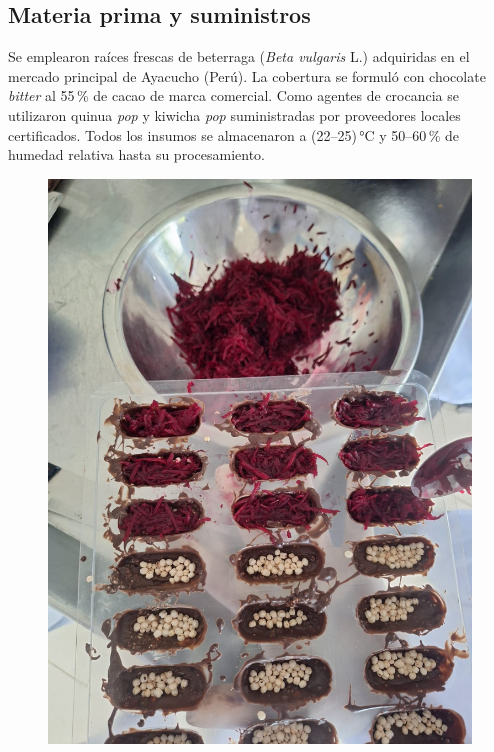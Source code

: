 \documentclass[manuscript,screen,review]{acmart}
\begin{document}
    \subsection{Materia prima y suministros}
    Se emplearon raíces frescas de beterraga (\textit{Beta vulgaris} L.) adquiridas en el mercado principal de Ayacucho (Perú).  
    La cobertura se formuló con chocolate \emph{bitter} al 55\,\% de cacao de marca comercial.  
    Como agentes de crocancia se utilizaron quinua \emph{pop} y kiwicha \emph{pop} suministradas por proveedores locales certificados.  
    Todos los insumos se almacenaron a (22–25)\,°C y 50–60\,\% de humedad relativa hasta su procesamiento.
        \begin{figure}[H]
          \centering
          \begin{minipage}{0.48\linewidth}
            \centering
            \includegraphics[width=0.9\linewidth]{imagen/beterraga-quinua.jpeg}
            
            \vspace{1mm}
            

\end{minipage}
\end{figure}
\end{document}
